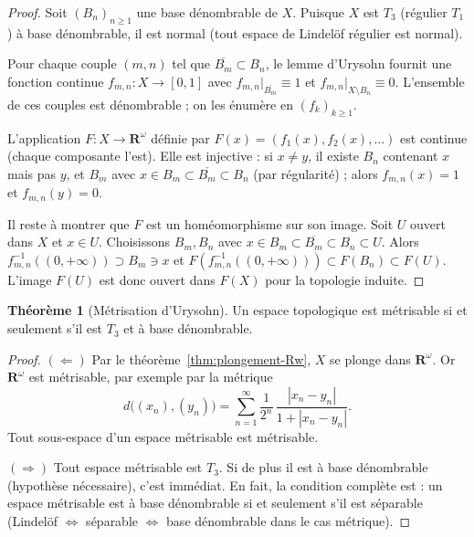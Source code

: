\documentclass[12pt,a4paper,openany]{book}
\theoremstyle{definition}
\theoremstyle{cours}
\newtheorem{theoreme}{Théorème}[chapter]
\theoremstyle{coursnormal}
\begin{document}
\begin{proof}
Soit $(B_n)_{n\ge 1}$ une base dénombrable de $X$.
Puisque $X$ est $T_3$ (régulier $T_1$) à base dénombrable, il est
normal (tout espace de Lindel\"of r\'egulier est normal).

Pour chaque couple $(m,n)$ tel que $\overline{B_m}\subset B_n$,
le lemme d'Urysohn fournit une fonction continue
$f_{m,n}\colon X\to[0,1]$ avec $f_{m,n}|_{\overline{B_m}}\equiv 1$
et $f_{m,n}|_{X\setminus B_n}\equiv 0$. L'ensemble de ces couples
est dénombrable ; on les énumère en $(f_k)_{k\ge 1}$.

L'application $F\colon X\to\mathbf{R}^\omega$ définie par
$F(x)=(f_1(x),f_2(x),\ldots)$ est continue (chaque composante l'est).
Elle est injective : si $x\neq y$, il existe $B_n$ contenant $x$
mais pas $y$, et $B_m$ avec $x\in B_m\subset\overline{B_m}\subset B_n$
(par régularité) ; alors $f_{m,n}(x)=1$ et $f_{m,n}(y)=0$.

Il reste à montrer que $F$ est un homéomorphisme sur son image.
Soit $U$ ouvert dans $X$ et $x\in U$. Choisissons $B_m,B_n$ avec
$x\in B_m\subset\overline{B_m}\subset B_n\subset U$. Alors
$f_{m,n}^{-1}((0,+\infty))\supset B_m\ni x$ et
$F(f_{m,n}^{-1}((0,+\infty)))\subset F(B_n)\subset F(U)$.
L'image $F(U)$ est donc ouvert dans $F(X)$ pour la topologie induite.
\end{proof}

\begin{theoreme}[Métrisation d'Urysohn]
\label{thm:metrisation-urysohn}
Un espace topologique est métrisable si et
seulement s'il est $T_3$ et à base dénombrable.
\end{theoreme}

\begin{proof}
$(\Leftarrow)$ Par le théorème~\ref{thm:plongement-Rw},
$X$ se plonge dans $\mathbf{R}^\omega$. Or $\mathbf{R}^\omega$ est
métrisable, par exemple par la métrique
\[
d\bigl((x_n),(y_n)\bigr)
  = \sum_{n=1}^{\infty}\frac{1}{2^n}\,
    \frac{|x_n-y_n|}{1+|x_n-y_n|}.
\]
Tout sous-espace d'un espace métrisable est métrisable.

$(\Rightarrow)$ Tout espace métrisable est $T_3$.
Si de plus il est à base dénombrable (hypothèse nécessaire), c'est
immédiat. En fait, la condition complète est : un espace métrisable
est à base dénombrable si et seulement s'il est séparable
(Lindelöf $\Leftrightarrow$ séparable $\Leftrightarrow$ base
dénombrable dans le cas métrique).
\end{proof}
\end{document}
